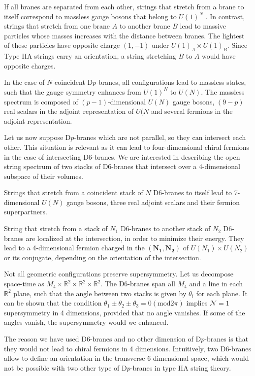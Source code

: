 If all branes are separated from each other, strings that stretch from a brane to itself correspond to massless gauge bosons that belong to $U(1)^N$ .
In contrast, strings that stretch from one brane $A$ to another brane $B$ lead to massive particles whose
masses increases with the distance between branes.
The lightest of these particles have opposite charge $(1,-1)$ under $U(1)_A \times U(1)_B$.
Since Type IIA strings carry an orientation, a string stretching $B$ to $A$ would have opposite charges.

In the case of $N$ coincident D$p$-branes, all configurations lead to massless states, such that the 
gauge symmetry enhances from $U(1)^N$ to $U(N)$.
The massless spectrum is composed of $(p-1)$-dimensional $U(N)$ gauge bosons, $(9-p)$ real
scalars in the adjoint representation of $U(N$ and several fermions in the adjoint representation.


Let us now suppose D$p$-branes which are not parallel, so they can intersect each other.
This situation is relevant as it can lead to four-dimensional chiral fermions in the case of intersecting D6-branes.
We are interested in describing the open string spectrum of two stacks of D$6$-branes that intersect over a 4-dimensional subspace of their volumes.

Strings that stretch from a coincident stack of $N$ D6-branes to itself lead to 7-dimensional $U(N)$ gauge bosons, three real adjoint scalars and their fermion superpartners.

String that stretch from a stack of $N_1$ D6-branes to another stack of $N_2$ D6-branes are localized at the intersection,
in order to minimize their energy. 
They lead to a 4-dimensional fermion charged in the $(\mathbf{N_1},\mathbf{N_2})$ of $U(N_1)\times U(N_2)$ or its conjugate, depending on the orientation
of the intersection.

Not all geometric configurations preserve supersymmetry. 
Let us decompose space-time as $M_4 \times \mathbb R^2 \times \mathbb R^2 \times \mathbb R^2 $.
The D6-branes span all $M_4$ and a line in each $\mathbb R^2$ plane, such that the angle between
two stacks is given by $\theta_i$ for each plane.
It can be shown that the condition $\theta_1\pm\theta_2\pm\theta_3=0 (\mathrm{mod} 2\pi)$ implies $\mathcal N=1$ 
supersymmetry in 4 dimensions, provided that no angle vanishes.
If some of the angles vanish, the supersymmetry would we enhanced.

The reason we have used D6-branes and no other dimension of D$p$-branes is that they would not lead to chiral fermions in 4 dimensions.
Intuitively, two D6-branes allow to define an orientation in the transverse 6-dimensional space, which would not be possible
with two other type of D$p$-branes in type IIA string theory.
